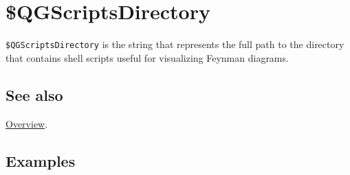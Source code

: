 \documentclass[../FeynHelpersManual.tex]{subfiles}
\begin{document}
\hypertarget{dollarqgscriptsdirectory}{
\section{\$QGScriptsDirectory}\label{dollarqgscriptsdirectory}}

\texttt{\$QGScriptsDirectory} is the string that represents the full
path to the directory that contains shell scripts useful for visualizing
Feynman diagrams.

\subsection{See also}

\hyperlink{toc}{Overview}.

\subsection{Examples}
\end{document}
